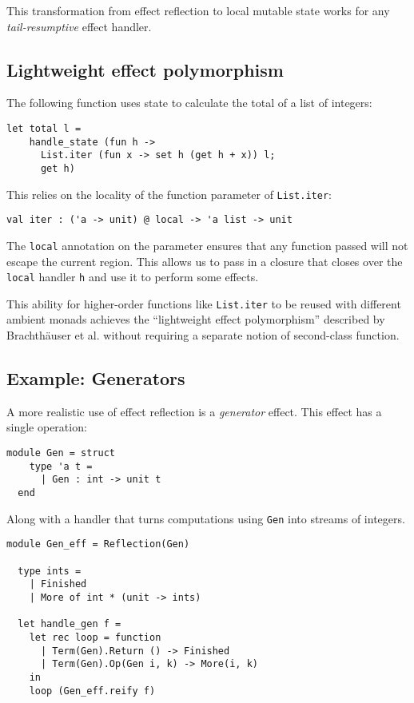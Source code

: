 \documentclass[acmsmall, screen, nonacm]{acmart}
\theoremstyle{definition}
\begin{document}
This transformation from effect reflection to local mutable state works
for any \emph{tail-resumptive} effect handler.

\subsection{Lightweight effect polymorphism}

The following function uses state to calculate the total of a list of
integers:
\begin{lstlisting}[style=oxcaml]
  let total l =
    handle_state (fun h ->
      List.iter (fun x -> set h (get h + x)) l;
      get h)
\end{lstlisting}
This relies on the locality of the function parameter of
\lstinline[style=oxcaml]{List.iter}:
\begin{lstlisting}[style=oxcaml]
  val iter : ('a -> unit) @ local -> 'a list -> unit
\end{lstlisting}
The \lstinline[style=oxcaml]{local} annotation on the parameter ensures
that any function passed will not escape the current region. This allows
us to pass in a closure that closes over the
\lstinline[style=oxcaml]{local} handler \lstinline[style=oxcaml]{h} and
use it to perform some effects.

This ability for higher-order functions like
\lstinline[style=oxcaml]{List.iter} to be reused with different ambient
monads achieves the ``lightweight effect polymorphism'' described by
Brachth{\"a}user et al.\cite{brachthauser2020effects} without requiring
a separate notion of second-class function.

\subsection{Example: Generators}

A more realistic use of effect reflection is a \emph{generator}
effect. This effect has a single operation:
\begin{lstlisting}[style=oxcaml]
  module Gen = struct
    type 'a t =
      | Gen : int -> unit t
  end
\end{lstlisting}
Along with a handler that turns computations using
\lstinline[style=oxcaml]{Gen} into streams of integers.
\begin{lstlisting}[style=oxcaml]
  module Gen_eff = Reflection(Gen)

  type ints =
    | Finished
    | More of int * (unit -> ints)

  let handle_gen f =
    let rec loop = function
      | Term(Gen).Return () -> Finished
      | Term(Gen).Op(Gen i, k) -> More(i, k)
    in
    loop (Gen_eff.reify f)
\end{lstlisting}
\end{document}
